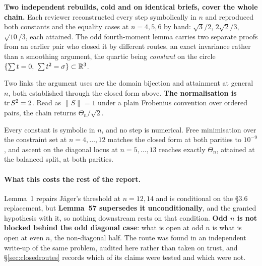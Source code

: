 \begin{certificate}
\textbf{Two independent rebuilds, cold and on identical briefs, cover the whole chain.} Each reviewer reconstructed every step symbolically in $n$ and reproduced both constants and the equality cases at $n=4,5,6$ by hand: $\sqrt3/2$, $2\sqrt2/3$, $\sqrt{10}/3$, each attained. The odd fourth-moment lemma carries two separate proofs from an earlier pair who closed it by different routes, an exact invariance rather than a smoothing argument, the quartic being \emph{constant} on the circle $\{\sum t=0,\ \sum t^2=\sigma\}\subset\R^3$.

Two links the argument uses are the domain bijection and attainment at general $n$, both established through the closed form above. \textbf{The normalisation is $\operatorname{tr} S^2=2$}. Read as $\|S\|=1$ under a plain Frobenius convention over ordered pairs, the chain returns $\Theta_n/\sqrt2$.

Every constant is symbolic in $n$, and no step is numerical. Free minimisation over the constraint set at $n=4,\dots,12$ matches the closed form at both parities to $10^{-9}$, and ascent on the diagonal locus at $n=5,\dots,13$ reaches exactly $\Theta_n$, attained at the balanced split, at both parities.
\end{certificate}

\paragraph{What this costs the rest of the report.} Lemma~1 repairs J\"ager's threshold at $n=12,14$ and is conditional on the \S3.6 replacement, but \textbf{Lemma~57 supersedes it unconditionally}, and the granted hypothesis with it, so nothing downstream rests on that condition. \textbf{Odd $n$ is not blocked behind the odd diagonal case}: what is open at odd $n$ is what is open at even $n$, the non-diagonal half. The route was found in an independent write-up of the same problem, audited here rather than taken on trust, and \S\ref{sec:closedroutes} records which of its claims were tested and which were not.

